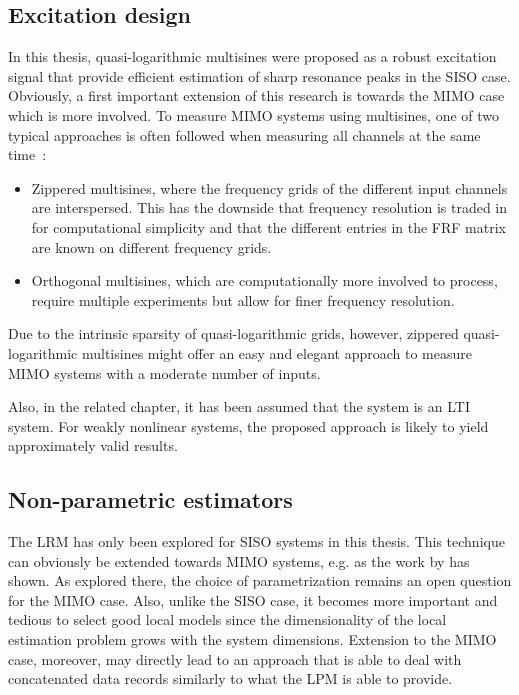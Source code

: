   \subsection{Excitation design}
  In this thesis, quasi-logarithmic multisines were proposed as a robust excitation signal that provide efficient estimation of sharp resonance peaks in the \gls{SISO} case.
  Obviously, a first important extension of this research is towards the \gls{MIMO} case which is more involved.
  To measure \gls{MIMO} systems using multisines, one of two typical approaches is often followed when measuring all channels at the same time~\citep[Section 2.7]{Pintelon2012}:
  \begin{itemize}
    \item Zippered multisines, where the frequency grids of the different input channels are interspersed. This has the downside that frequency resolution is traded in for computational simplicity and that the different entries in the \gls{FRF} matrix are known on different frequency grids.
    \item Orthogonal multisines, which are computationally more involved to process, require multiple experiments but allow for finer frequency resolution.
  \end{itemize}
  Due to the intrinsic sparsity of quasi-logarithmic grids, however, zippered quasi-logarithmic multisines might offer an easy and elegant  approach to measure \gls{MIMO} systems with a moderate number of inputs.

  Also, in the related chapter, it has been assumed that the system is an \gls{LTI} system.
  For weakly nonlinear systems, the proposed approach is likely to yield approximately valid results.

  \subsection{Non-parametric estimators}
    The \gls{LRM} has only been explored for \gls{SISO} systems in this thesis.
    This technique can obviously be extended towards \gls{MIMO} systems, e.g. as the work by \citet{vanRietschoten2015MSc} has shown.
    As explored there, the choice of parametrization remains an open question for the \gls{MIMO} case.
    Also, unlike the \gls{SISO} case, it becomes more important and tedious to select good local models since the dimensionality of the local estimation problem grows with the system dimensions.
    Extension to the \gls{MIMO} case, moreover, may directly lead to an approach that is able to deal with concatenated data records similarly to what the \gls{LPM} is able to provide.

